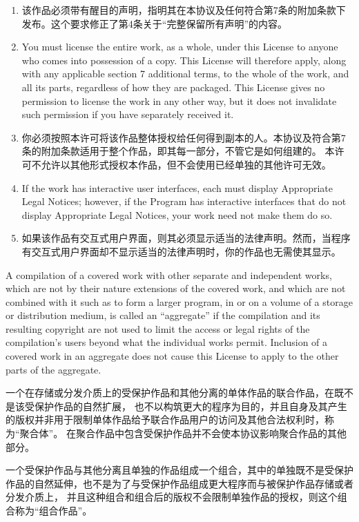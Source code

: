 \documentclass[11pt]{article}
\begin{document}
\begin{enumerate}
\begin{enumerate}
  \item 该作品必须带有醒目的声明，指明其在本协议及任何符合第7条的附加条款下发布。这个要求修正了第4条关于“完整保留所有声明”的内容。

  \item You must license the entire work, as a whole, under this
  License to anyone who comes into possession of a copy.  This
  License will therefore apply, along with any applicable section 7
  additional terms, to the whole of the work, and all its parts,
  regardless of how they are packaged.  This License gives no
  permission to license the work in any other way, but it does not
  invalidate such permission if you have separately received it.

  \item 你必须按照本许可将该作品整体授权给任何得到副本的人。本协议及符合第7条的附加条款适用于整个作品，即其每一部分，不管它是如何组建的。
  本许可不允许以其他形式授权本作品，但不会使用已经单独的其他许可无效。

  \item If the work has interactive user interfaces, each must display
  Appropriate Legal Notices; however, if the Program has interactive
  interfaces that do not display Appropriate Legal Notices, your
  work need not make them do so.

  \item 如果该作品有交互式用户界面，则其必须显示适当的法律声明。然而，当程序有交互式用户界面却不显示适当的法律声明时，你的作品也无需使其显示。

\end{enumerate}
A compilation of a covered work with other separate and independent
works, which are not by their nature extensions of the covered work,
and which are not combined with it such as to form a larger program,
in or on a volume of a storage or distribution medium, is called an
``aggregate'' if the compilation and its resulting copyright are not
used to limit the access or legal rights of the compilation's users
beyond what the individual works permit.  Inclusion of a covered work
in an aggregate does not cause this License to apply to the other
parts of the aggregate.

一个在存储或分发介质上的受保护作品和其他分离的单体作品的联合作品，在既不是该受保护作品的自然扩展，
也不以构筑更大的程序为目的，并且自身及其产生的版权并非用于限制单体作品给予联合作品用户的访问及其他合法权利时，称为“聚合体”。
在聚合作品中包含受保护作品并不会使本协议影响聚合作品的其他部分。

一个受保护作品与其他分离且单独的作品组成一个组合，其中的单独既不是受保护作品的自然延伸，也不是为了与受保护作品组成更大程序而与被保护作品存储或者分发介质上，
并且这种组合和组合后的版权不会限制单独作品的授权，则这个组合称为“组合作品”。


\end{enumerate}
\end{document}
